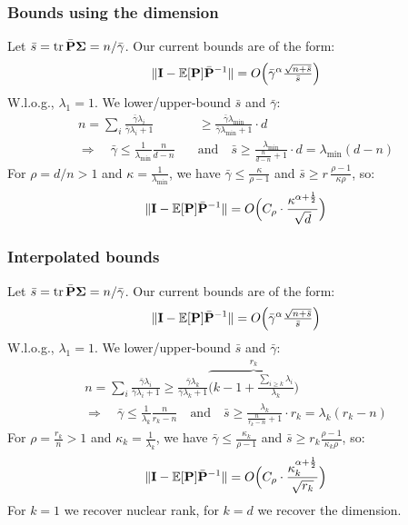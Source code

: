 \documentclass[10pt]{beamer}
\begin{document}
  \begin{frame}
    \frametitle{Bounds using the dimension}
    Let $\bar s = \mathrm{tr}\,\bar{\mathbf P}\mathbf{\Sigma} = n/\bar\gamma$. Our current bounds are of the form:
    \begin{align*}
      \|\mathbf I-\mathbb E[\mathbf P]\bar{\mathbf P}^{-1}\| =
      O\Big(\bar\gamma^{\alpha}\tfrac{\sqrt{n+\bar s}}{\bar s}\Big)
    \end{align*}
W.l.o.g., $\lambda_1=1$. We lower/upper-bound $\bar s$ and $\bar\gamma$:
    \begin{align*}
n= \sum_i \frac{\bar\gamma\lambda_i}{\bar\gamma\lambda_i + 1}
      &\geq
      \frac{\bar\gamma\lambda_{\min}}{\bar\gamma\lambda_{\min}+1}\cdot d\\
\Rightarrow \quad
      \bar\gamma\leq \frac1{\lambda_{\min}}\frac n{d-n}
\quad&\text{and}\quad
      \bar s\geq \frac{\lambda_{\min}}{\frac n{d-n}+1}\cdot d = \lambda_{\min}(d-n)
    \end{align*}
For $\rho = d/n>1$ and $\kappa=\frac1{\lambda_{\min}}$, we have
$\bar\gamma\leq \frac\kappa{\rho-1}$ and $\bar s\geq r\,\frac{\rho-1}{\kappa\rho}$, so: 
    \begin{align*}
      \|\mathbf I-\mathbb E[\mathbf P]\bar{\mathbf P}^{-1}\| = O\Big(C_\rho\cdot \frac{\kappa^{\alpha+\frac12}}{\sqrt d}\Big)
    \end{align*}
\end{frame}
    
    \begin{frame}
      \frametitle{Interpolated bounds}
    Let $\bar s = \mathrm{tr}\,\bar{\mathbf P}\mathbf{\Sigma} = n/\bar\gamma$. Our current bounds are of the form:
    \begin{align*}
      \|\mathbf I-\mathbb E[\mathbf P]\bar{\mathbf P}^{-1}\| =
      O\Big(\bar\gamma^{\alpha}\tfrac{\sqrt{n+\bar s}}{\bar s}\Big)
    \end{align*}
W.l.o.g., $\lambda_1=1$. We lower/upper-bound $\bar s$ and $\bar\gamma$:
  \vspace{-5mm}
    \begin{align*}
      n= \sum_i \frac{\bar\gamma\lambda_i}{\bar\gamma\lambda_i + 1}
      \geq
      \frac{\bar\gamma\lambda_k}{\bar\gamma\lambda_k+1}
      \overbrace{\bigg(k-1+\frac{\sum_{i\geq k}\lambda_i}{\lambda_k}\bigg)}^{r_k}\\
\Rightarrow \quad
      \bar\gamma\leq \frac1{\lambda_k}\frac n{r_k-n}
\quad\text{and}\quad
      \bar s\geq \frac{\lambda_k}{\frac n{r_k-n}+1}\cdot r_k = \lambda_k(r_k-n)
    \end{align*}
For $\rho = \frac{r_k}{n}>1$ and $\kappa_k=\frac1{\lambda_k}$, we have
    $\bar\gamma\leq \frac{\kappa_k}{\rho-1}$ and $\bar s\geq r_k\frac{\rho-1}{\kappa_k\rho}$, so:
    \begin{align*}
      \|\mathbf I-\mathbb E[\mathbf P]\bar{\mathbf P}^{-1}\| = O\Big(C_\rho\cdot\frac{\kappa_k^{\alpha+\frac12}}{\sqrt {r_k}}\Big)
    \end{align*}
For $k=1$ we recover nuclear rank, for $k=d$ we recover the dimension.
\end{frame}
\end{document}
